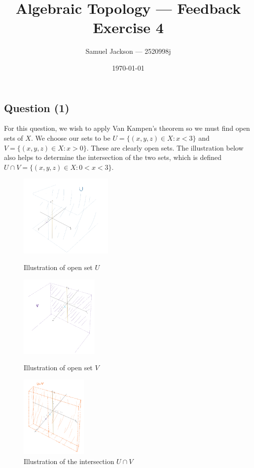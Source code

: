 \documentclass{article}
\title{Algebraic Topology  --- Feedback Exercise 4}
\author{Samuel Jackson --- 2520998j}
\date{\today}
\begin{document}
\maketitle

\newcommand{\R}{\mathbb{R}}
\newcommand{\Z}{\mathbb{Z}}
\newcommand{\N}{\mathbb{N}}
\newcommand{\fund}{\pi_1}
\newcommand{\pind}{p_{\ast}}

\begin{center}
    \section*{Question (1)}
\end{center}

\begin{flushleft}
    For this question, we wish to apply Van Kampen's theorem so we must find open sets of $X$. We choose our sets to be $U = \{(x, y, z) \in X : x < 3\}$ and $V = \{(x,y,z) \in X : x > 0\}$. These are clearly open sets. The illustration below also helps to determine the intersection of the two sets, which is defined $U \cap V = \{(x,y,z) \in X : 0 < x < 3\}$. 

    \begin{figure}[h]
            \includegraphics[height=4cm, width=\linewidth]{images/u-openset.png}
            \caption*{Illustration of open set $U$}
        \endminipage\hfill
            \includegraphics[height=4cm, width=\linewidth]{images/v-openset.png}
            \caption*{Illustration of open set $V$}
        \endminipage\hfill
            \includegraphics[height=4cm, width=\linewidth]{images/intersect-openset.png}
            \caption*{Illustration of the intersection $U \cap V$}
        \endminipage
    \end{figure}


\end{flushleft}
\end{document}

